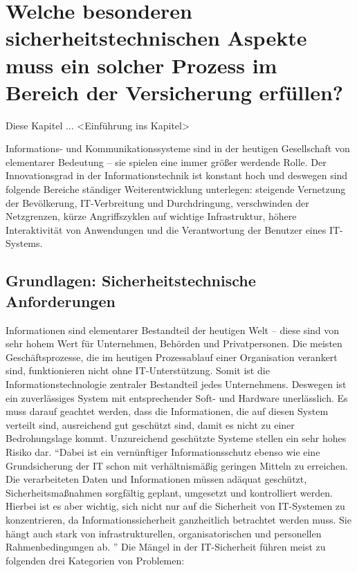 \chapter[Forschungsfrage 3]{Welche besonderen sicherheitstechnischen Aspekte muss ein solcher Prozess im Bereich der Versicherung erfüllen?} \label{ff3}
Diese Kapitel ... <Einführung ins Kapitel>
\par
Informations- und Kommunikationssysteme sind in der heutigen Gesellschaft von elementarer Bedeutung -- sie spielen eine immer größer werdende Rolle. Der Innovationsgrad in der Informationstechnik ist konstant hoch und deswegen sind folgende Bereiche ständiger Weiterentwicklung unterlegen: steigende Vernetzung der Bevölkerung, IT-Verbreitung und Durchdringung, verschwinden der Netzgrenzen, kürze Angriffszyklen auf wichtige Infrastruktur, höhere Interaktivität von Anwendungen und die Verantwortung der Benutzer eines IT-Systems.\autocite[vgl.][S.2f.]{bundesamt_fur_sicherheit_in_der_informationstechnik_bsi_it-grundschutz-kompendium_2020}

\section{Grundlagen: Sicherheitstechnische Anforderungen}\label{kap:sicherheitstechnischeAnforderungen}
Informationen sind elementarer Bestandteil der heutigen Welt -- diese sind von sehr hohem Wert für Unternehmen, Behörden und Privatpersonen. Die meisten Geschäftsprozesse, die im heutigen Prozessablauf einer Organisation verankert sind, funktionieren nicht ohne IT-Unterstützung. Somit ist die Informationstechnologie zentraler Bestandteil jedes Unternehmens. Deswegen ist ein zuverlässiges System mit entsprechender Soft- und Hardware unerlässlich. Es muss darauf geachtet werden, dass die Informationen, die auf diesen System verteilt sind, ausreichend gut geschützt sind, damit es nicht zu einer Bedrohungslage kommt. Unzureichend geschützte Systeme stellen ein sehr hohes Risiko dar. \enquote{Dabei ist ein vernünftiger Informationsschutz ebenso wie eine Grundsicherung der IT schon mit verhältnismäßig geringen Mitteln zu erreichen. Die verarbeiteten Daten und Informationen müssen adäquat geschützt, Sicherheitsmaßnahmen sorgfältig geplant, umgesetzt und kontrolliert werden. Hierbei ist es aber wichtig, sich nicht nur auf die Sicherheit von IT-Systemen zu konzentrieren, da Informationssicherheit ganzheitlich betrachtet werden muss. Sie	hängt auch stark von infrastrukturellen, organisatorischen und personellen Rahmenbedingungen ab. }\autocite[][S.1]{bundesamt_fur_sicherheit_in_der_informationstechnik_bsi_it-grundschutz-kompendium_2020} Die Mängel in der IT-Sicherheit führen meist zu folgenden drei Kategorien von Problemen\autocite[vgl.][S.1ff.]{bundesamt_fur_sicherheit_in_der_informationstechnik_bsi_it-grundschutz-kompendium_2020}: 

